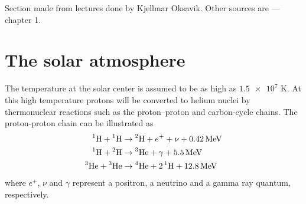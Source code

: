 \begin{remark}
    Section made from lectures done by Kjellmar Oksavik. Other sources are \citet{BrekkeAsgeir2013Potu} --- chapter 1.
\end{remark}
\section{The solar atmosphere}
The temperature at the solar center is assumed to be as high as \(\num{1.5e7}\) K. At this high temperature protons will be converted to helium nuclei by thermonuclear reactions such as the proton–proton and carbon-cycle chains. The proton-proton chain can be illustrated as
\begin{align*}
    \prescript{1}{}{\textnormal{H}}+\prescript{1}{}{\textnormal{H}}&\rightarrow \prescript{2}{}{\textnormal{H}}+e^++\nu+\SI{0.42}{\mega\electronvolt}\\
    \prescript{1}{}{\textnormal{H}}+\prescript{2}{}{\textnormal{H}}&\rightarrow \prescript{3}{}{\textnormal{He}}+\gamma+\SI{5.5}{\mega\electronvolt}\\
    \prescript{3}{}{\textnormal{He}}+\prescript{3}{}{\textnormal{He}}&\rightarrow \prescript{4}{}{\textnormal{He}}+2\prescript{1}{}{\textnormal{H}}+\SI{12.8}{\mega\electronvolt}
\end{align*}
where \(e^+\), \(\nu \) and \(\gamma \) represent a positron, a neutrino and a gamma ray quantum, respectively.

